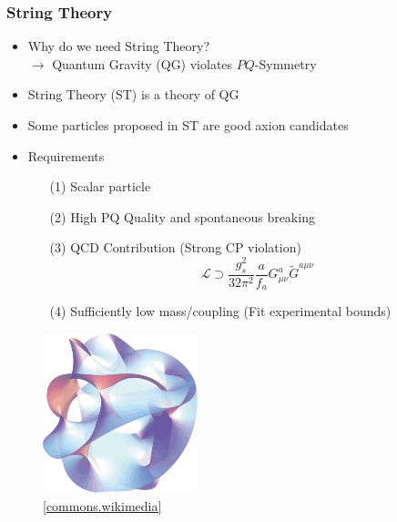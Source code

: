 \documentclass[aspectratio=1610, 9pt]{beamer}
\begin{document}
\begin{frame}
	\frametitle{String Theory}
	\begin{minipage}{0.55\textwidth}
		\begin{itemize}
			\item Why do we need String Theory?\\
			$\rightarrow$ Quantum Gravity (QG) violates $PQ$-Symmetry
			\item String Theory (ST) is a theory of QG
			\item Some particles proposed in ST are good axion candidates\\
			\item Requirements
			\begin{itemize}
				\item[(1)] Scalar particle
				\item[(2)] High PQ Quality and spontaneous breaking
				\item[(3)] QCD Contribution (Strong CP violation)\\
				\begin{equation*}
					\mathcal{L} \supset \frac{g_s^2}{32 \pi^2} \frac{a}{f_a} G^a_{\mu \nu} \tilde{G}^{a \mu \nu}
				\end{equation*}
				\item[(4)] Sufficiently low mass/coupling (Fit experimental bounds)
			\end{itemize}			
			
		\end{itemize}
	\end{minipage}
	\hfill
	\begin{minipage}{0.4\textwidth}
		\begin{figure}
			\centering
			\includegraphics[width=4.5cm]{images/string.pdf}
			\caption{\href{https://en.wikipedia.org/wiki/File:Calabi_yau_formatted.svg}{[commons.wikimedia]}}
		\end{figure}
	\end{minipage}
\end{frame}
\end{document}
